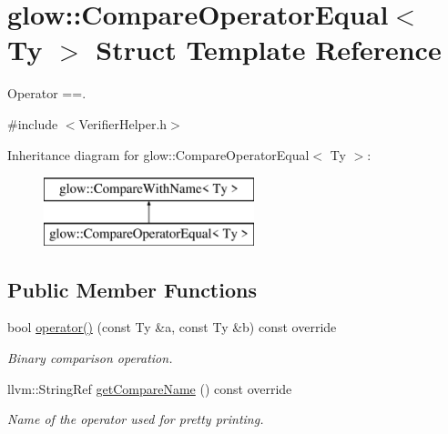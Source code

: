 \hypertarget{structglow_1_1_compare_operator_equal}{}\section{glow\+:\+:Compare\+Operator\+Equal$<$ Ty $>$ Struct Template Reference}
\label{structglow_1_1_compare_operator_equal}


Operator ==.  




{\ttfamily \#include $<$Verifier\+Helper.\+h$>$}

Inheritance diagram for glow\+:\+:Compare\+Operator\+Equal$<$ Ty $>$\+:\begin{figure}[H]
\begin{center}
\leavevmode
\includegraphics[height=2.000000cm]{structglow_1_1_compare_operator_equal}
\end{center}
\end{figure}
\subsection*{Public Member Functions}
\begin{DoxyCompactItemize}
\item 
\mbox{\label{structglow_1_1_compare_operator_equal_a3f1dee1e7e38103026aa8df3f59b1c38}} 
bool \hyperlink{structglow_1_1_compare_operator_equal_a3f1dee1e7e38103026aa8df3f59b1c38}{operator()} (const Ty \&a, const Ty \&b) const override
\begin{DoxyCompactList}\small\item\em Binary comparison operation. \end{DoxyCompactList}\item 
\mbox{\label{structglow_1_1_compare_operator_equal_a24fc23e39de6934532006fbcffcdd08c}} 
llvm\+::\+String\+Ref \hyperlink{structglow_1_1_compare_operator_equal_a24fc23e39de6934532006fbcffcdd08c}{get\+Compare\+Name} () const override
\begin{DoxyCompactList}\small\item\em Name of the operator used for pretty printing. \end{DoxyCompactList}\end{DoxyCompactItemize}



